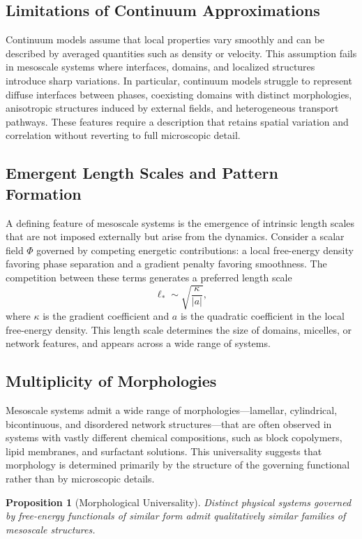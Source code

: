 \documentclass[11pt, a4paper, twocolumn]{article}
\newtheorem{proposition}[definition]{Proposition}
\begin{document}
\subsection{Limitations of Continuum Approximations}

Continuum models assume that local properties vary smoothly and can be described
by averaged quantities such as density or velocity. This assumption fails in
mesoscale systems where interfaces, domains, and localized structures introduce
sharp variations. In particular, continuum models struggle to represent diffuse
interfaces between phases, coexisting domains with distinct morphologies,
anisotropic structures induced by external fields, and heterogeneous transport
pathways. These features require a description that retains spatial variation
and correlation without reverting to full microscopic detail.

\subsection{Emergent Length Scales and Pattern Formation}

A defining feature of mesoscale systems is the emergence of intrinsic length
scales that are not imposed externally but arise from the dynamics. Consider a
scalar field $\Phi$ governed by competing energetic contributions: a local
free-energy density favoring phase separation and a gradient penalty favoring
smoothness. The competition between these terms generates a preferred length
scale
\[
    \ell_* \sim \sqrt{\frac{\kappa}{|a|}},
\]
where $\kappa$ is the gradient coefficient and $a$ is the quadratic coefficient
in the local free-energy density. This length scale determines the size of
domains, micelles, or network features, and appears across a wide range of
systems.

\subsection{Multiplicity of Morphologies}

Mesoscale systems admit a wide range of morphologies---lamellar, cylindrical,
bicontinuous, and disordered network structures---that are often observed in
systems with vastly different chemical compositions, such as block copolymers,
lipid membranes, and surfactant solutions. This universality suggests that
morphology is determined primarily by the structure of the governing functional
rather than by microscopic details.

\begin{proposition}[Morphological Universality]
Distinct physical systems governed by free-energy functionals of similar form
admit qualitatively similar families of mesoscale structures.
\end{proposition}
\end{document}
